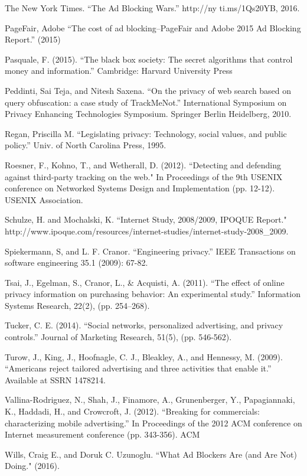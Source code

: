 \documentclass[conference]{IEEEtran}
\begin{document}
\begin{thebibliography}{99}
 The New York Times. “The Ad Blocking Wars.” http://ny ti.ms/1Qs20YB, 2016.

 PageFair, Adobe “The cost of ad blocking–PageFair and Adobe 2015 Ad Blocking Report.” (2015)

 Pasquale, F. (2015). “The black box society: The secret algorithms that control money and information.” Cambridge: Harvard University Press

 Peddinti, Sai Teja, and Nitesh Saxena. “On the privacy of web search based on query obfuscation: a case study of TrackMeNot.” International Symposium on Privacy Enhancing Technologies Symposium. Springer Berlin Heidelberg, 2010.

 Regan, Priscilla M. “Legislating privacy: Technology, social values, and public policy.” Univ. of North Carolina Press, 1995.

 Roesner, F., Kohno, T., and Wetherall, D. (2012). “Detecting and defending against third-party tracking on the web." In Proceedings of the 9th USENIX conference on Networked Systems Design and Implementation (pp. 12-12). USENIX Association.

 Schulze, H. and Mochalski, K. “Internet Study, 2008/2009, IPOQUE Report."
http://www.ipoque.com/resources/internet-studies/internet-study-2008\_2009.

 Spiekermann, S, and L. F. Cranor. “Engineering privacy.” IEEE Transactions on software engineering 35.1 (2009): 67-82.

 Tsai, J., Egelman, S., Cranor, L., \& Acquisti, A. (2011). “The effect of online privacy information on purchasing behavior: An experimental study.” Information Systems Research, 22(2), (pp. 254–268).

 Tucker, C. E. (2014). “Social networks, personalized advertising, and privacy controls.” Journal of Marketing Research, 51(5), (pp. 546-562).

 Turow, J., King, J., Hoofnagle, C. J., Bleakley, A., and Hennessy, M. (2009). “Americans reject tailored advertising and three activities that enable it.” Available at SSRN 1478214.

 Vallina-Rodriguez, N., Shah, J., Finamore, A., Grunenberger, Y., Papagiannaki, K., Haddadi, H., and Crowcroft, J. (2012). “Breaking for commercials: characterizing mobile advertising.” In Proceedings of the 2012 ACM conference on Internet measurement conference (pp. 343-356). ACM

 Wills, Craig E., and Doruk C. Uzunoglu. “What Ad Blockers Are (and Are Not) Doing." (2016).

\end{thebibliography}
\end{document}
